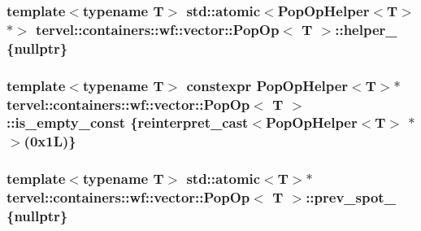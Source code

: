\subsubsection[{helper\+\_\+}]{\setlength{\rightskip}{0pt plus 5cm}template$<$typename T$>$ std\+::atomic$<${\bf Pop\+Op\+Helper}$<$T$>$ $\ast$$>$ {\bf tervel\+::containers\+::wf\+::vector\+::\+Pop\+Op}$<$ T $>$\+::helper\+\_\+ \{nullptr\}\hspace{0.3cm}{\ttfamily [private]}}\label{classtervel_1_1containers_1_1wf_1_1vector_1_1_pop_op_a628660acd654de451aa0554f365a458d}
\hypertarget{classtervel_1_1containers_1_1wf_1_1vector_1_1_pop_op_a2f0d5f83e90cec090ec83ae5ba5d056b}{}
\subsubsection[{is\+\_\+empty\+\_\+const}]{\setlength{\rightskip}{0pt plus 5cm}template$<$typename T$>$ constexpr {\bf Pop\+Op\+Helper}$<$T$>$$\ast$ {\bf tervel\+::containers\+::wf\+::vector\+::\+Pop\+Op}$<$ T $>$\+::is\+\_\+empty\+\_\+const \{reinterpret\+\_\+cast$<${\bf Pop\+Op\+Helper}$<$T$>$ $\ast$$>$(0x1\+L)\}\hspace{0.3cm}{\ttfamily [static]}}\label{classtervel_1_1containers_1_1wf_1_1vector_1_1_pop_op_a2f0d5f83e90cec090ec83ae5ba5d056b}
\hypertarget{classtervel_1_1containers_1_1wf_1_1vector_1_1_pop_op_afedc8c1eafbacd0601a72c43fd1dc521}{}
\subsubsection[{prev\+\_\+spot\+\_\+}]{\setlength{\rightskip}{0pt plus 5cm}template$<$typename T$>$ std\+::atomic$<$T$>$$\ast$ {\bf tervel\+::containers\+::wf\+::vector\+::\+Pop\+Op}$<$ T $>$\+::prev\+\_\+spot\+\_\+ \{nullptr\}\hspace{0.3cm}{\ttfamily [private]}}\label{classtervel_1_1containers_1_1wf_1_1vector_1_1_pop_op_afedc8c1eafbacd0601a72c43fd1dc521}
\hypertarget{classtervel_1_1containers_1_1wf_1_1vector_1_1_pop_op_a32b0803cfcf70ab2b86b59b6790eb676}{}
